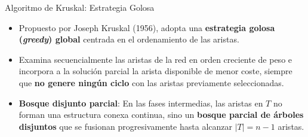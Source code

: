 \documentclass[
  ignorenonframetext,
]{beamer}
\providecommand{\tightlist}{%
  \setlength{\itemsep}{0pt}\setlength{\parskip}{0pt}}
\begin{document}
\begin{frame}{Algoritmo de Kruskal: Estrategia Golosa}
\label{algoritmo-de-kruskal-estrategia-golosa}
\begin{tcolorbox}[enhanced jigsaw, left=2mm, opacityback=0, titlerule=0mm, breakable, toptitle=1mm, rightrule=.15mm, bottomtitle=1mm, coltitle=black, title=\textcolor{quarto-callout-note-color}{\faInfo}\hspace{0.5em}{Filosofía del Algoritmo de Kruskal (1956)}, colframe=quarto-callout-note-color-frame, colbacktitle=quarto-callout-note-color!10!white, arc=.35mm, toprule=.15mm, leftrule=.75mm, bottomrule=.15mm, opacitybacktitle=0.6, colback=white]

\begin{itemize}
\tightlist
\item
  Propuesto por Joseph Kruskal (1956), adopta una \textbf{estrategia
  golosa (\emph{greedy}) global} centrada en el ordenamiento de las
  aristas.
\item
  Examina secuencialmente las aristas de la red en orden creciente de
  peso e incorpora a la solución parcial la arista disponible de menor
  coste, siempre que \textbf{no genere ningún ciclo} con las aristas
  previamente seleccionadas.
\end{itemize}

\end{tcolorbox}

\begin{itemize}
\tightlist
\item
  \textbf{Bosque disjunto parcial}: En las fases intermedias, las
  aristas en \(T\) no forman una estructura conexa continua, sino un
  \textbf{bosque parcial de árboles disjuntos} que se fusionan
  progresivamente hasta alcanzar \(|T| = n - 1\) aristas.
\end{itemize}
\end{frame}
\end{document}
